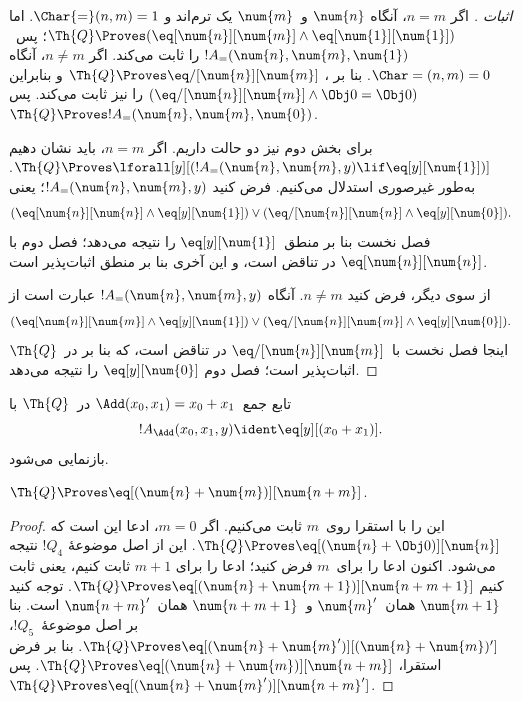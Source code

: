 \documentclass[../../../include/open-logic-section]{subfiles}
\begin{document}
\begin{proof}[اثبات ]
اگر $n=m$، آنگاه $\num{n}$ و~$\num{m}$ یک ترم‌اند و
$\Char{=}(n,m)=1$. اما
$\Th{Q}\Proves(\eq[\num{n}][\num{m}]\land
\eq[\num{1}][\num{1}])$؛ پس~$!A_=(\num{n},\num{m},\num{1})$ را
ثابت می‌کند. اگر $n\neq m$، آنگاه $\Char=(n,m)=0$. بنا بر
،
$\Th{Q}\Proves\eq/[\num{n}][\num{m}]$ و بنابراین
$(\eq/[\num{n}][\num{m}]\land\Obj 0=\Obj 0)$ را نیز ثابت می‌کند.
پس $\Th{Q}\Proves !A_=(\num{n},\num{m},\num{0})$.

برای بخش دوم نیز دو حالت داریم. اگر $n=m$، باید نشان دهیم
$\Th{Q}\Proves\lforall[y][(!A_=(\num{n},\num{m},y)
\lif\eq[y][\num{1}])]$. به‌طور غیرصوری استدلال می‌کنیم. فرض کنید
$!A_=(\num{n},\num{m},y)$؛ یعنی
\[
(\eq[\num{n}][\num{n}] \land \eq[y][\num{1}]) \lor
(\eq/[\num{n}][\num{n}] \land \eq[y][\num{0}]).
\]
فصل نخست بنا بر منطق~$\eq[y][\num{1}]$ را نتیجه می‌دهد؛ فصل دوم با
$\eq[\num{n}][\num{n}]$ در تناقض است، و این آخری بنا بر منطق
اثبات‌پذیر است.

از سوی دیگر، فرض کنید $n\neq m$. آنگاه
$!A_=(\num{n},\num{m},y)$ عبارت است از
\[
(\eq[\num{n}][\num{m}] \land \eq[y][\num{1}]) \lor
(\eq/[\num{n}][\num{m}] \land \eq[y][\num{0}]).
\]
اینجا فصل نخست با~$\eq/[\num{n}][\num{m}]$ در تناقض است، که بنا بر
 در~$\Th{Q}$ اثبات‌پذیر است؛ فصل دوم
$\eq[y][\num{0}]$ را نتیجه می‌دهد.
\end{proof}

\begin{prop}
تابع جمع~$\Add(x_0,x_1)=x_0+x_1$ در~$\Th{Q}$ با
\[
  !A_{\Add}(x_0, x_1, y) \ident \eq[y][(x_0 + x_1)].
\]
بازنمایی می‌شود.
\end{prop}

\begin{lem}
$\Th{Q} \Proves \eq[(\num{n} + \num{m})][\num{n+m}]$.
\end{lem}

\begin{proof}
این را با استقرا روی~$m$ ثابت می‌کنیم. اگر $m=0$، ادعا این است که
$\Th{Q}\Proves\eq[(\num{n}+\Obj 0)][\num{n}]$. این از اصل موضوعهٔ
$!Q_4$ نتیجه می‌شود. اکنون ادعا را برای~$m$ فرض کنید؛ ادعا را برای
$m+1$ ثابت کنیم، یعنی ثابت کنیم
$\Th{Q}\Proves\eq[(\num{n}+\num{m+1})][\num{n+m+1}]$. توجه کنید
$\num{m+1}$ همان~$\num{m}'$ و~$\num{n+m+1}$ همان~$\num{n+m}'$ است.
بنا بر اصل موضوعهٔ~$!Q_5$،
$\Th{Q}\Proves\eq[(\num{n}+\num{m}')][(\num{n}+\num{m})']$. بنا بر
فرض استقرا،
$\Th{Q}\Proves\eq[(\num{n}+\num{m})][\num{n+m}]$. پس
$\Th{Q}\Proves\eq[(\num{n}+\num{m}')][\num{n+m}']$.
\end{proof}
\end{document}
